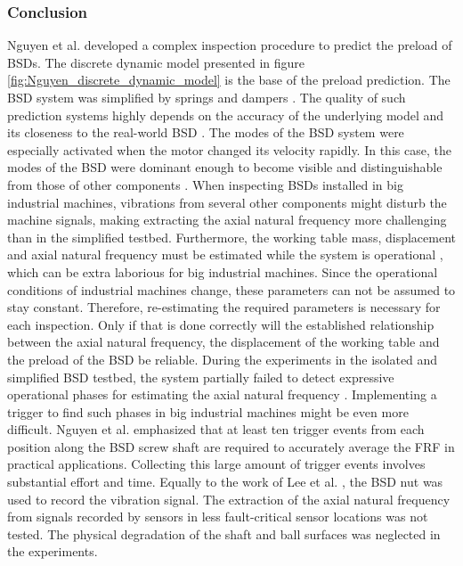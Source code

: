 \subsubsection{Conclusion}
Nguyen et al. \cite{NGUYEN2019} developed a complex inspection procedure to predict the preload of BSDs. The discrete dynamic model presented in figure \ref{fig:Nguyen_discrete_dynamic_model} is the base of the preload prediction. The BSD system was simplified by springs and dampers \cite{NGUYEN2019}. The quality of such prediction systems highly depends on the accuracy of the underlying model and its closeness to the real-world BSD \cite{ZHAO2019213}. The modes of the BSD system were especially activated when the motor changed its velocity rapidly. In this case, the modes of the BSD were dominant enough to become visible and distinguishable from those of other components \cite{NGUYEN2019}. When inspecting BSDs installed in big industrial machines, vibrations from several other components might disturb the machine signals, making extracting the axial natural frequency more challenging than in the simplified testbed. Furthermore, the working table mass, displacement and axial natural frequency must be estimated while the system is operational \cite{NGUYEN2019}, which can be extra laborious for big industrial machines. Since the operational conditions of industrial machines change, these parameters can not be assumed to stay constant. Therefore, re-estimating the required parameters is necessary for each inspection. Only if that is done correctly will the established relationship between the axial natural frequency, the displacement of the working table and the preload of the BSD be reliable. During the experiments in the isolated and simplified BSD testbed, the system partially failed to detect expressive operational phases for estimating the axial natural frequency \cite{NGUYEN2019}. Implementing a trigger to find such phases in big industrial machines might be even more difficult. Nguyen et al. \cite{NGUYEN2019} emphasized that at least ten trigger events from each position along the BSD screw shaft are required to accurately average the FRF in practical applications. Collecting this large amount of trigger events involves substantial effort and time. Equally to the work of Lee et al. \cite{Lee2015}, the BSD nut was used to record the vibration signal. The extraction of the axial natural frequency from signals recorded by sensors in less fault-critical sensor locations was not tested. The physical degradation of the shaft and ball surfaces was neglected in the experiments.

